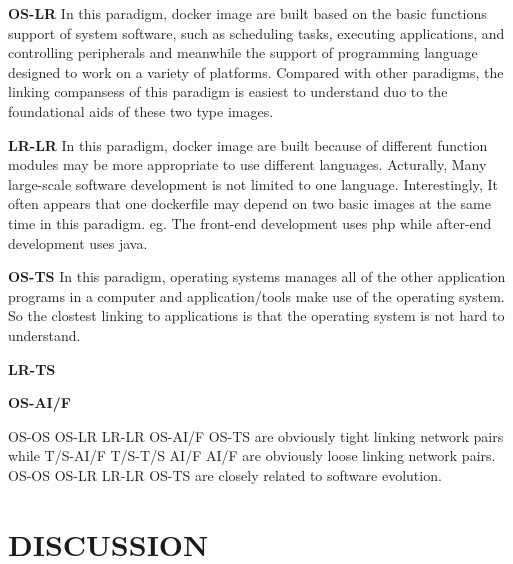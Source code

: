 \documentclass[sigconf]{acmart}
\begin{document}
\noindent\textbf{OS-LR }  In this paradigm, docker image are built based on the basic functions support of system software, such as scheduling tasks, executing applications, and controlling peripherals and meanwhile the support of programming language designed to work on a variety of platforms. Compared with other paradigms, the linking compansess of this paradigm is easiest to understand duo to the foundational aids of these two type images. 

\noindent\textbf{LR-LR }  In this paradigm, docker image are built because of different function modules may be more appropriate to use different languages. {\color{blue} Acturally, Many large-scale software development is not limited to one language. }Interestingly, It often appears that one dockerfile may depend on two basic images at the same time in this paradigm. eg. The front-end development uses php while after-end development uses java. 


\noindent\textbf{OS-TS }  In this paradigm, operating systems manages all of the other application programs in a computer and application/tools make use of the operating system. So the clostest linking to applications is that the operating system is not hard to understand.


\noindent\textbf{LR-TS }



\noindent\textbf{OS-AI/F }






\begin{mybox}
OS-OS OS-LR LR-LR OS-AI/F OS-TS are obviously tight linking network pairs while  T/S-AI/F T/S-T/S AI/F AI/F are obviously loose linking network pairs. OS-OS OS-LR LR-LR OS-TS are closely related to software evolution.
\end{mybox}





\section{DISCUSSION}
\end{document}
